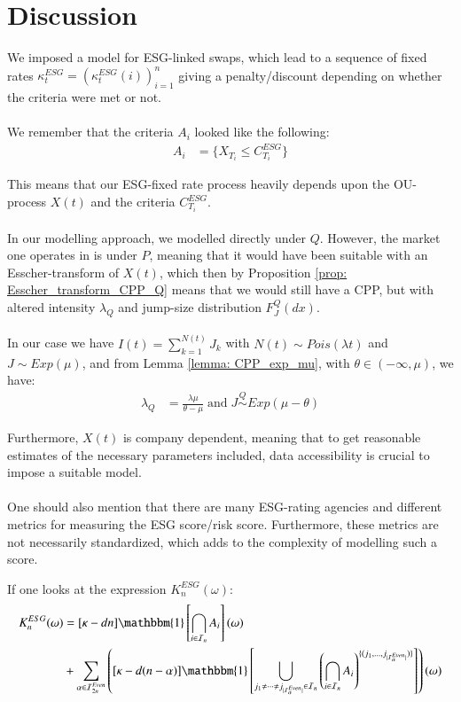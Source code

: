 \chapter{Discussion}

We imposed a model for ESG-linked swaps, which lead to a sequence of fixed rates $\kappa_{t}^{ESG}  = (\kappa_{t}^{ESG}(i))_{i=1}^{n}$ giving a penalty/discount depending on whether the criteria were met or not.
\\~\\ 
We remember that the criteria $A_{i}$ looked like the following:
\begin{align*}
A_{i} &= \{X_{T_{i}} \leq C_{T_{i}}^{ESG}\}    
\end{align*}

This means that our ESG-fixed rate process heavily depends upon the OU-process $X(t)$ and the criteria $C_{T_{i}}^{ESG}$. 
\\~\\
In our modelling approach, we modelled directly under $Q$. However, the market one operates in is under $P$, meaning that it would have been suitable with an Esscher-transform of $X(t)$, which then by  Proposition \ref{prop: Esscher_transform_CPP_Q} means that we would still have a CPP, but with altered intensity $\lambda_{Q}$ and jump-size distribution $F_{J}^{Q}(dx)$.
\\~\\
In our case we have $I(t) = \sum_{k=1}^{N(t)}J_{k}$ with $N(t) \sim Pois(\lambda t)$ and 
$J\sim Exp(\mu)$, and from Lemma \ref{lemma: CPP_exp_mu}, with $\theta \in (-\infty, \mu)$, we have:
\begin{align*}
\lambda_{Q} &= \frac{\lambda \mu}{\theta - \mu} \;\text{and}\;
J \stackrel{Q}{\sim} Exp(\mu - \theta)
\end{align*}

Furthermore, $X(t)$ is company dependent, meaning that to get reasonable estimates of the necessary parameters included, data accessibility is crucial to impose a suitable model. 
\\~\\ 
One should also mention that there are many ESG-rating agencies and different metrics for measuring the ESG score/risk score. Furthermore, these metrics are not necessarily standardized, which adds to the complexity of modelling such a score. 


\newpage 
If one looks at the expression $K_{n}^{ESG}(\omega)$: 
\begin{align*}
K_{n}^{ESG}(\omega) &= 
[\kappa -dn]\mathbbm{1}\left[
\bigcap_{i\in \mathcal{I}_{n}}A_{i}
\right](\omega) \\ 
&+ 
\sum_{\alpha \in \mathcal{I}_{2n}^{Even}}
\left(
[\kappa -d(n-\alpha)]\mathbbm{1}\left[
\bigcup_{
j_{1}\neq \dots \neq j_{|\mathcal{I}_{\alpha}^{Even}|}
\in \mathcal{I}_{n}
}\left(
\bigcap_{i\in \mathcal{I}_{n}}A_{i}
\right)^{
\{
(j_{1}, \dots , j_{|\mathcal{I}_{\alpha}^{Even}|})
\}
}
\right]
\right)(\omega) 
\end{align*}

